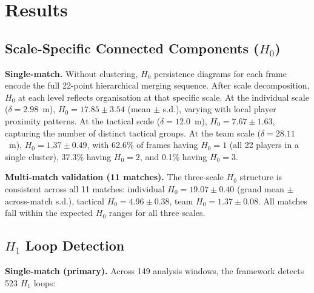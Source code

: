 \section{Results}
\label{sec:results}

\subsection{Scale-Specific Connected Components (\(H_0\))}
\label{sec:scale_h0}

\textbf{Single-match.} Without clustering, \(H_0\) persistence diagrams for each frame encode the full 22-point hierarchical merging sequence. After scale decomposition, \(H_0\) at each level reflects organisation at that specific scale. At the individual scale (\(\delta=2.98\)~m), \(H_0=17.85\pm3.54\) (mean \(\pm\) s.d.), varying with local player proximity patterns. At the tactical scale (\(\delta=12.0\)~m), \(H_0=7.67\pm1.63\), capturing the number of distinct tactical groups. At the team scale (\(\delta=28.11\)~m), \(H_0=1.37\pm0.49\), with 62.6\% of frames having \(H_0=1\) (all 22 players in a single cluster), 37.3\% having \(H_0=2\), and 0.1\% having \(H_0=3\).

\textbf{Multi-match validation (11 matches).} The three-scale \(H_0\) structure is consistent across all 11 matches: individual \(H_0=19.07\pm0.40\) (grand mean \(\pm\) across-match s.d.), tactical \(H_0=4.96\pm0.38\), team \(H_0=1.37\pm0.08\). All matches fall within the expected \(H_0\) ranges for all three scales.

\subsection{\(H_1\) Loop Detection}

\textbf{Single-match (primary).} Across 149 analysis windows, the framework detects 523 \(H_1\) loops:

\begin{table}[H]
  \centering
  \caption{Single-match \texorpdfstring{$H_1$}{H1} statistics (primary match, 149 windows).}
  \label{tab:h1single}
\end{table}

